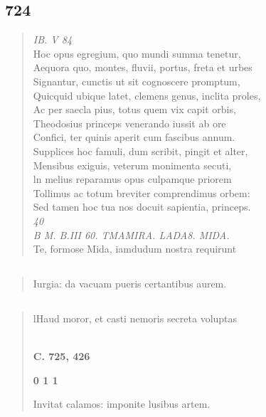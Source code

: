 \documentclass[11pt, a4paper]{report}
\begin{document}
            \subsection*{724}
      \begin{verse}
      \textit{IB. V 84} \\ Hoc opus egregium, quo mundi summa tenetur, \\ Aequora quo, montes, fluvii, portus, freta et urbes \\ Signantur, cunctis ut sit cognoscere promptum, \\ Quicquid ubique latet, clemens genus, inclita proles, \\ Ac per saecla pius, totus quem vix capit orbis, \\ Theodosius princeps venerando iussit ab ore \\ Confici, ter quinis aperit cum fascibus annum. \\ Supplices hoc famuli, dum scribit, pingit et alter, \\ Mensibus exiguis, veterum monimenta secuti, \\ ln melius reparamus opus culpamque priorem \\ Tollimus ac totum breviter comprendimus orbem: \\ Sed tamen hoc tua nos docuit sapientia, princeps. \\ \textit{40} \\ \textit{B M. B.III 60. TMAMIRA. LADA8. MIDA.} \\ Te, formose Mida, iamdudum nostra requirunt \\ 
      \end{verse}
  
            \subsection*{}
      \begin{verse}
      Iurgia: da vacuam pueris certantibus aurem. \\ 
      \end{verse}
  
            \subsection*{}
      \begin{verse}
      lHaud moror, et casti nemoris secreta voluptas \\ 
        ﻿\pagebreak 
    \begin{center} \textbf{C. 725, 426} \end{center}\begin{center} \textbf{0 1 1} \end{center}Invitat calamos: imponite lusibus artem. \\ 
      \end{verse}
  
\end{document}
